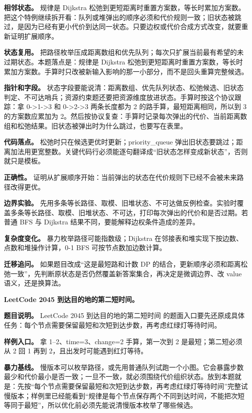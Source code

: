 \textbf{相邻状态。} 规律是 Dijkstra 松弛到更短距离时重置方案数，等长时累加方案数。把这个特例继续拆开看：队列或堆弹出的顺序必须和代价规则一致；旧状态被跳过，是因为已经有更小代价到达同一状态。只要边权或代价合成方式改变，就要重新证明扩展顺序。

\textbf{状态复用。} 把路径枚举压成距离数组和优先队列；每次只扩展当前最有希望的未过期状态。本题落点是：规律是 Dijkstra 松弛到更短距离时重置方案数，等长时累加方案数。手算时只改被新输入影响的那一小部分，而不是回头重算完整候选。

\textbf{指针和字段。} 状态字段要能说清：距离数组、优先队列状态、松弛候选、旧状态判定、不可达哨兵；资源约束题还要把资源维度放进状态。手算时按这个协议跟踪：拿 0->1->3 和 0->2->3 两条长度都为 2 的路手算，最短距离相同，所以到 3 的方案数应累加为 2。然后按协议复查：手算时记录每次弹出的代价、当前距离数组和松弛结果。旧状态被弹出时为什么跳过，也要写在表里。

\textbf{代码落点。} 松弛时只在候选更优时更新；priority\_queue 弹出旧状态要跳过；距离加法用更宽整数。关键代码行必须能逐句翻译成“旧状态怎样变成新状态”，否则就只是模板。

\textbf{正确性。} 证明从扩展顺序开始：当前弹出的状态在代价规则下已经不会被未来路径改得更优。

\textbf{边界实验。} 先用多条等长路径、取模、旧堆状态、不可达做反例检查。实验时覆盖多条等长路径、取模、旧堆状态、不可达，打印每次弹出的代价和是否过期。若普通 BFS 与 Dijkstra 结果不同，要能解释边权条件造成的差异。

\textbf{复杂度变化。} 暴力枚举路径可能指数级；Dijkstra 在邻接表和堆实现下按边数、点数和堆操作计算，0-1 BFS 可按节点数加边数计算。

\textbf{迁移追问。} 如果题目改成“这是最短路和计数 DP 的结合，更新顺序必须和距离松弛一致”，先判断原状态是否仍然覆盖新答案集合，再决定是微调边界、改 value 语义，还是换算法。

\noindent\textbf{LeetCode 2045 到达目的地的第二短时间。}

\textbf{题目说明。} LeetCode 2045 到达目的地的第二短时间 的题面入口要先还原成具体任务：每个节点需要保留最短和次短到达步数，再考虑红绿灯等待时间。

\textbf{样例入口。} 拿 1--2、time=3、change=2 手算，第一次到 2 是最短；第二短必须从 2 回 1 再到 2，且出发时可能遇到红灯等待。

\textbf{暴力基线。} 慢版本可以枚举路径，或先用普通队列试跑一个小图。它会暴露步数最少和代价最小是否一致；一旦不一致，就必须围绕代价组织状态。放到本题就是：先按“每个节点需要保留最短和次短到达步数，再考虑红绿灯等待时间”完整试慢版本；样例里已经能看到“规律是每个节点保存两个不同到达时间，不能把次短等同于最短”，所以优化前必须先能说清慢版本枚举了哪些候选。

